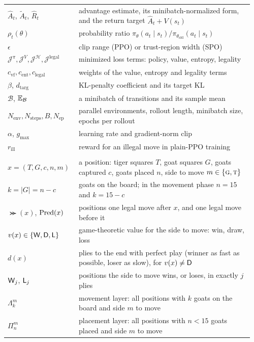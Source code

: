 {\begin{longtable}{@{}>{\raggedright\arraybackslash}p{0.27\linewidth}>{\raggedright\arraybackslash}p{0.69\linewidth}@{}}
$\hat A_t$, $\tilde A_t$, $\hat R_t$ & advantage estimate, its minibatch-normalized form, and the return target $\hat A_t + V(s_t)$ \\
$\rho_t(\theta)$ & probability ratio $\pi_\theta(a_t \mid s_t) / \pi_{\theta_{\text{old}}}(a_t \mid s_t)$ \\
$\epsilon$ & clip range (PPO) or trust-region width (SPO) \\
$\mathcal{J}^\pi, \mathcal{J}^V, \mathcal{J}^{\mathcal{H}}, \mathcal{J}^{\text{legal}}$ & minimized loss terms: policy, value, entropy, legality \\
$c_{\text{vf}}, c_{\text{ent}}, c_{\text{legal}}$ & weights of the value, entropy and legality terms \\
$\beta$, $d_{\text{targ}}$ & KL-penalty coefficient and its target KL \\
$\mathcal{B}$, $\mathbb{E}_{\mathcal{B}}$ & a minibatch of transitions and its sample mean \\
$N_{\text{env}}, N_{\text{steps}}, B, N_{\text{ep}}$ & parallel environments, rollout length, minibatch size, epochs per rollout \\
$\alpha$, $g_{\max}$ & learning rate and gradient-norm clip \\
$r_{\text{ill}}$ & reward for an illegal move in plain-PPO training \\
\midrule
\multicolumn{2}{@{}l}{\textbf{Perfect play (Part III)}} \\
$x = (T, G, c, n, m)$ & a position: tiger squares $T$, goat squares $G$, goats captured $c$, goats placed $n$, side to move $m \in \{\textsc{g}, \textsc{t}\}$ \\
$k = |G| = n - c$ & goats on the board; in the movement phase $n = 15$ and $k = 15 - c$ \\
$\Succ(x)$, $\operatorname{Pred}(x)$ & positions one legal move after $x$, and one legal move before it \\
$v(x) \in \{\mathsf{W}, \mathsf{D}, \mathsf{L}\}$ & game-theoretic value for the side to move: win, draw, loss \\
$d(x)$ & plies to the end with perfect play (winner as fast as possible, loser as slow), for $v(x) \ne \mathsf{D}$ \\
$\mathsf{W}_j$, $\mathsf{L}_j$ & positions the side to move wins, or loses, in exactly $j$ plies \\
$\Lambda^m_k$ & movement layer: all positions with $k$ goats on the board and side $m$ to move \\
$\Pi^m_n$ & placement layer: all positions with $n < 15$ goats placed and side $m$ to move \\

\end{longtable}}
